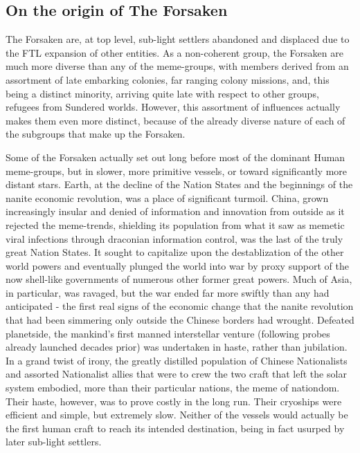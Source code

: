 \subsection{On the origin of The Forsaken}

The Forsaken are, at top level, sub-light settlers abandoned and
displaced due to the FTL expansion of other entities. As a
non-coherent group, the Forsaken are much more diverse than any of the
meme-groups, with members derived from an assortment of late embarking
colonies, far ranging colony missions, and, this being a distinct
minority, arriving quite late with respect to other groups, refugees
from Sundered worlds. However, this assortment of influences actually
makes them even more distinct, because of the already diverse nature
of each of the subgroups that make up the Forsaken.

Some of the Forsaken actually set out long before most of the dominant
Human meme-groups, but in slower, more primitive vessels, or toward
significantly more distant stars. Earth, at the decline of the Nation
States and the beginnings of the nanite economic revolution, was a
place of significant turmoil. China, grown increasingly insular and
denied of information and innovation from outside as it rejected the
meme-trends, shielding its population from what it saw as memetic
viral infections through draconian information control, was the last
of the truly great Nation States. It sought to capitalize upon the
destablization of the other world powers and eventually plunged the
world into war by proxy support of the now shell-like governments of
numerous other former great powers. Much of Asia, in particular, was
ravaged, but the war ended far more swiftly than any had anticipated -
the first real signs of the economic change that the nanite revolution
that had been simmering only outside the Chinese borders had
wrought. Defeated planetside, the mankind's first manned interstellar
venture (following probes already launched decades prior) was
undertaken in haste, rather than jubilation. In a grand twist of
irony, the greatly distilled population of Chinese Nationalists and
assorted Nationalist allies that were to crew the two craft that left
the solar system embodied, more than their particular nations, the
meme of nationdom. Their haste, however, was to prove costly in the
long run. Their cryoships were efficient and simple, but extremely
slow. Neither of the vessels would actually be the first human craft
to reach its intended destination, being in fact usurped by later
sub-light settlers.

